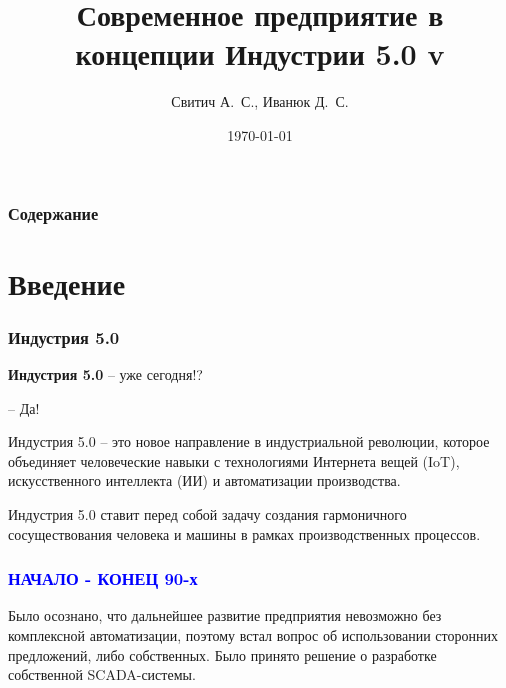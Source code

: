 \documentclass{beamer}
\title{
    Современное предприятие в концепции Индустрии 5.0
    \ifdefined\tagversion
        \newline
        \newline
        v\tagversion
    \fi}
\author{Свитич А.~С., Иванюк Д.~С.}
\institute{Савушкин продукт}
\date{\today}
\begin{document}
\frame{\titlepage}

\begin{frame}
    \frametitle{Содержание}
    \tableofcontents
\end{frame}

\section{Введение}
 {
  \begin{frame}
      \frametitle{Индустрия 5.0}

      {\Large \textbf{Индустрия 5.0}} -- уже сегодня!?

      -- Да!
  \end{frame}
 }
 \begin{frame}
    Индустрия 5.0 -- это новое направление в индустриальной революции, которое объединяет человеческие навыки с технологиями Интернета вещей (IoT), искусственного интеллекта (ИИ) и автоматизации производства.
 \end{frame}

 \begin{frame}
    Индустрия 5.0 ставит перед собой задачу создания гармоничного сосуществования человека и машины в рамках производственных процессов.
 \end{frame}

 \begin{frame}
    \frametitle{\textcolor{blue}{НАЧАЛО - КОНЕЦ 90-х}}

      Было осознано, что дальнейшее развитие предприятия невозможно без комплексной автоматизации, поэтому встал вопрос об использовании сторонних предложений, либо собственных. Было принято решение о разработке собственной SCADA-системы.

 \end{frame}
\end{document}
